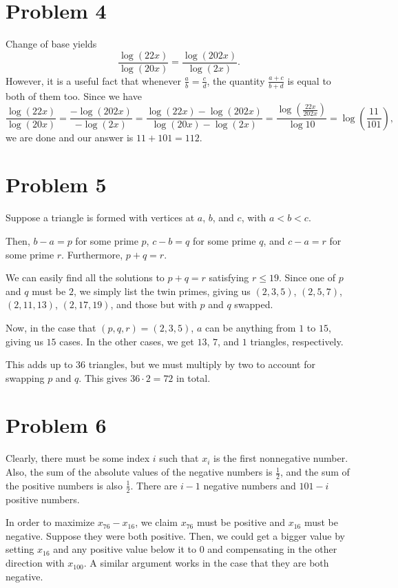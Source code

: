 \documentclass{scrartcl}
\begin{document}
\section*{Problem 4}
Change of base yields
\[ \frac{\log (22x)}{\log (20x)} = \frac{\log (202x)}{\log (2x)}. \]
However, it is a useful fact that whenever $\frac{a}{b} = \frac{c}{d}$, the quantity $\frac{a+c}{b+d}$
is equal to both of them too. Since we have
\[ \frac{\log (22x)}{\log (20x)} = \frac{-\log (202x)}{-\log (2x)} = \frac{\log (22x) - \log (202x)}{\log (20x) - \log (2x)} = \frac{\log\left(\frac{22x}{202x}\right)}{\log 10} = \log\left(\frac{11}{101}\right), \]
we are done and our answer is $11 + 101 = \boxed{112}$.

\section*{Problem 5}
Suppose a triangle is formed with vertices at $a$, $b$, and $c$,
with $a<b<c$.

Then, $b-a=p$ for some prime $p$, $c-b=q$ for some prime $q$, and $c-a=r$ for some prime $r$.
Furthermore, $p+q=r$.

We can easily find all the solutions to $p+q=r$ satisfying $r \le 19$.
Since one of $p$ and $q$ must be $2$, we simply list the twin primes, giving us
$(2,3,5)$, $(2,5,7)$, $(2,11,13)$, $(2,17,19)$, and those but with $p$ and $q$ swapped.

Now, in the case that $(p,q,r) = (2,3,5)$, $a$ can be anything from $1$ to $15$, giving us $15$ cases.
In the other cases, we get $13$, $7$, and $1$ triangles, respectively.

This adds up to $36$ triangles, but we must multiply by two to account for swapping $p$ and $q$.
This gives $36 \cdot 2 = \boxed{72}$ in total.

\section*{Problem 6}
Clearly, there must be some index $i$ such that $x_i$ is the first nonnegative number.
Also, the sum of the absolute values of the negative numbers
is $\frac12$, and the sum of the positive numbers is also $\frac12$.
There are $i-1$ negative numbers and $101-i$ positive numbers.

In order to maximize $x_{76} - x_{16}$, we claim $x_{76}$ must be positive and $x_{16}$ must be negative.
Suppose they were both positive. Then, we could get a bigger value by setting $x_{16}$ and
any positive value below it to $0$ and
compensating in the other direction with $x_{100}$.
A similar argument works in the case that they are both negative.
\end{document}

